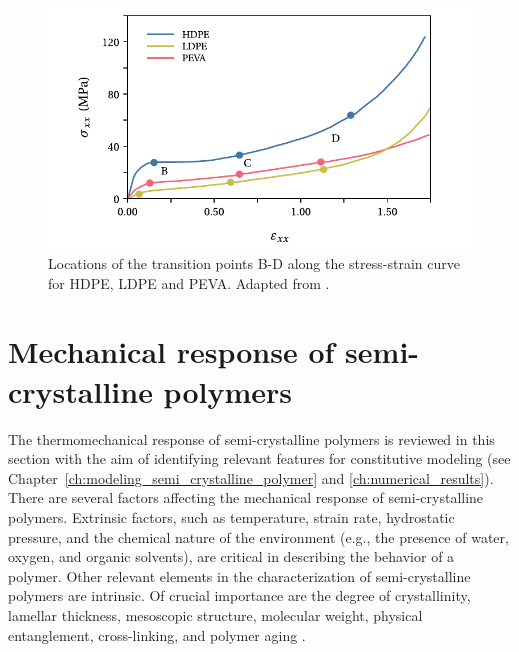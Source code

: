 \begin{figure}[htbp]
	\centering
	\includegraphics[width=\textwidth]{figures/stress_strain_curve_strobl}
	\caption{Locations of the transition points B-D along the stress-strain curve for HDPE, LDPE and PEVA. Adapted from \cite{hissNetworkStretchingSlip1999}.}
\label{fig:stress_strain_curve_strobl}
\end{figure}

\section{Mechanical response of semi-crystalline polymers}

The thermomechanical response of semi-crystalline polymers is reviewed in this section with the aim of identifying relevant features for constitutive modeling (see Chapter~\ref{ch:modeling_semi_crystalline_polymer} and \ref{ch:numerical_results}).
There are several factors affecting the mechanical response of semi-crystalline polymers.
Extrinsic factors, such as temperature, strain rate, hydrostatic pressure, and the chemical nature of the environment (e.g., the presence of water, oxygen, and organic solvents), are critical in describing the behavior of a polymer.
Other relevant elements in the characterization of semi-crystalline polymers are intrinsic.
Of crucial importance are the degree of crystallinity, lamellar thickness, mesoscopic structure, molecular weight, physical entanglement, cross-linking, and polymer aging \citep{ayoubEffectsCrystalContent2011, serbanTensilePropertiesSemicrystalline2013, callister2014materials, cundiffModelingViscoplasticBehavior2022}.

